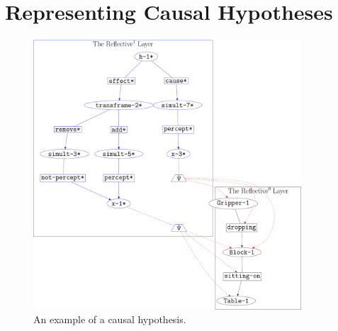 \section{Representing Causal Hypotheses}

\begin{figure}
\center
\includegraphics[width=10cm]{gfx/example_causal_hypothesis}
\caption{An example of a causal hypothesis.}
\label{figure:example_causal_hypothesis}
\end{figure}

